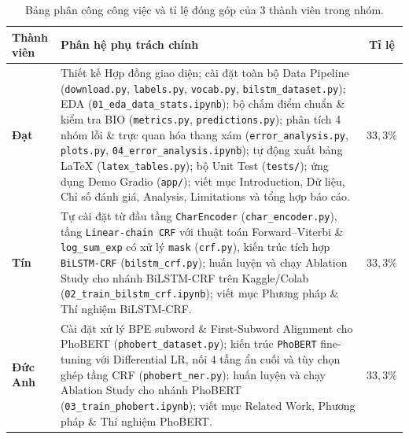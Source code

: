 \documentclass[11pt,a4paper,twocolumn]{article}
\begin{document}
\begin{table}[h]
\centering
\small
\begin{tabular}{p{1.5cm}p{4.6cm}c}
\hline
\textbf{Thành viên} & \textbf{Phân hệ phụ trách chính} & \textbf{Tỉ lệ} \\
\hline
\textbf{Đạt} &
Thiết kế Hợp đồng giao diện; cài đặt toàn bộ Data Pipeline (\texttt{download.py}, \texttt{labels.py}, \texttt{vocab.py}, \texttt{bilstm\_dataset.py}); EDA (\texttt{01\_eda\_data\_stats.ipynb}); bộ chấm điểm chuẩn \& kiểm tra BIO (\texttt{metrics.py}, \texttt{predictions.py}); phân tích 4 nhóm lỗi \& trực quan hóa thang xám (\texttt{error\_analysis.py}, \texttt{plots.py}, \texttt{04\_error\_analysis.ipynb}); tự động xuất bảng LaTeX (\texttt{latex\_tables.py}); bộ Unit Test (\texttt{tests/}); ứng dụng Demo Gradio (\texttt{app/}); viết mục Introduction, Dữ liệu, Chỉ số đánh giá, Analysis, Limitations và tổng hợp báo cáo. &
$33{,}3\%$ \\
\hline
\textbf{Tín} &
Tự cài đặt từ đầu tầng \texttt{CharEncoder} (\texttt{char\_encoder.py}), tầng \texttt{Linear-chain CRF} với thuật toán Forward--Viterbi \& \texttt{log\_sum\_exp} có xử lý \texttt{mask} (\texttt{crf.py}), kiến trúc tích hợp \texttt{BiLSTM-CRF} (\texttt{bilstm\_crf.py}); huấn luyện và chạy Ablation Study cho nhánh BiLSTM-CRF trên Kaggle/Colab (\texttt{02\_train\_bilstm\_crf.ipynb}); viết mục Phương pháp \& Thí nghiệm BiLSTM-CRF. &
$33{,}3\%$ \\
\hline
\textbf{Đức Anh} &
Cài đặt xử lý BPE subword \& First-Subword Alignment cho PhoBERT (\texttt{phobert\_dataset.py}); kiến trúc \texttt{PhoBERT} fine-tuning với Differential LR, nối 4 tầng ẩn cuối và tùy chọn ghép tầng CRF (\texttt{phobert\_ner.py}); huấn luyện và chạy Ablation Study cho nhánh PhoBERT (\texttt{03\_train\_phobert.ipynb}); viết mục Related Work, Phương pháp \& Thí nghiệm PhoBERT. &
$33{,}3\%$ \\
\hline
\end{tabular}
\caption{Bảng phân công công việc và tỉ lệ đóng góp của $3$ thành viên trong nhóm.}
\label{tab:member_contrib}
\end{table}
\end{document}
